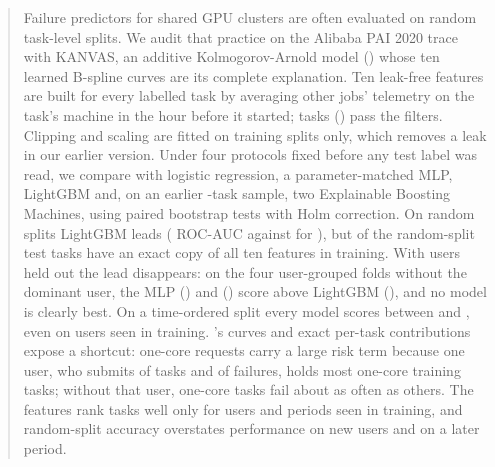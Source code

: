 \begin{abstract}
Failure predictors for shared GPU clusters are often evaluated on random task-level splits. We audit that practice on the Alibaba PAI 2020 trace with KANVAS, an additive Kolmogorov-Arnold model (\kaam{}) whose ten learned B-spline curves are its complete explanation. Ten leak-free features are built for every labelled task by averaging other jobs' telemetry on the task's machine in the hour before it started;  tasks () pass the filters. Clipping and scaling are fitted on training splits only, which removes a leak in our earlier version. Under four protocols fixed before any test label was read, we compare \kaam{} with logistic regression, a parameter-matched MLP, LightGBM and, on an earlier -task sample, two Explainable Boosting Machines, using paired bootstrap tests with Holm correction. On random splits LightGBM leads ( ROC-AUC against  for \kaam{}), but  of the random-split test tasks have an exact copy of all ten features in training. With users held out the lead disappears: on the four user-grouped folds without the dominant user, the MLP () and \kaam{} () score above LightGBM (), and no model is clearly best. On a time-ordered split every model scores between  and , even on users seen in training. \kaam{}'s curves and exact per-task contributions expose a shortcut: one-core requests carry a large risk term because one user, who submits  of tasks and  of failures, holds most one-core training tasks; without that user, one-core tasks fail about as often as others. The features rank tasks well only for users and periods seen in training, and random-split accuracy overstates performance on new users and on a later period.
\end{abstract}
